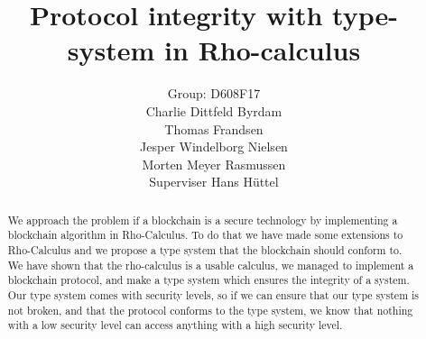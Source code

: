 \mainmatter  %

\title{Protocol integrity with type-system in Rho-calculus}




\author{Group: D608F17\\Charlie Dittfeld Byrdam\\Thomas Frandsen\\Jesper Windelborg Nielsen\\Morten Meyer Rasmussen\\Superviser Hans Hüttel}




\toctitle{}
\tocauthor{}
\maketitle
\begin{abstract}
We approach the problem if a blockchain is a secure technology by implementing a blockchain algorithm in Rho-Calculus. To do that we have made some extensions to Rho-Calculus and we propose a type system that the blockchain should conform to. We have shown that the rho-calculus is a usable calculus, we managed to implement a blockchain protocol, and make a type system which ensures the integrity of a system. Our type system comes with security levels, so if we can ensure that our type system is not broken, and that the protocol conforms to the type system, we know that nothing with a low security level can access anything with a high security level.
\end{abstract}
\clearpage
